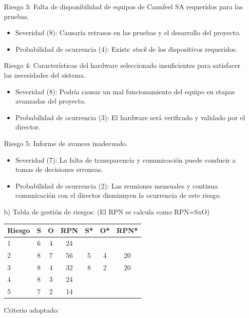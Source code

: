\documentclass[
11pt, %
codirector, %
]{charter}
\begin{document}
Riesgo 3: Falta de disponibilidad de equipos de Cannfeel SA requeridos para las pruebas.
\begin{itemize}
	\item Severidad (8): Causaría retrasos en las pruebas y el desarrollo del proyecto.
	\item Probabilidad de ocurrencia (4): Existe \textit{stock} de los dispositivos requeridos. 
\end{itemize}

Riesgo 4:  Características del hardware seleccionado insuficientes para satisfacer las necesidades
del sistema.
\begin{itemize}
	\item Severidad (8): Podría causar un mal funcionamiento del equipo en etapas avanzadas del proyecto.
	\item Probabilidad de ocurrencia (3): El hardware será verificado y validado por el director. 
\end{itemize}

Riesgo 5:  Informe de avances inadecuado.
\begin{itemize}
	\item Severidad (7): La falta de transparencia y comunicación puede conducir a tomas de decisiones erroneas.
	\item Probabilidad de ocurrencia (2): Las reuniones mensuales y continua comunicación con el director disminuyen la ocurrencia de este riesgo. 
\end{itemize}


b) Tabla de gestión de riesgos:      (El RPN se calcula como RPN=SxO)

\begin{table}[htpb]
\centering
\begin{tabularx}{\linewidth}{@{}|X|c|c|c|c|c|c|@{}}
\hline
\rowcolor[HTML]{C0C0C0} 
Riesgo & S & O & RPN & S* & O* & RPN* \\ \hline
   1   & 6 & 4 &  24 &    &    &      \\ \hline
   2   & 8 & 7 &  56 & 5  & 4  & 20   \\ \hline
   3   & 8 & 4 &  32 & 8  & 2  & 20   \\ \hline
   4   & 8 & 3 &  24 &    &    &      \\ \hline
   5   & 7 & 2 &  14 &    &    &      \\ \hline
\end{tabularx}%
\end{table}

Criterio adoptado: 
\end{document}
